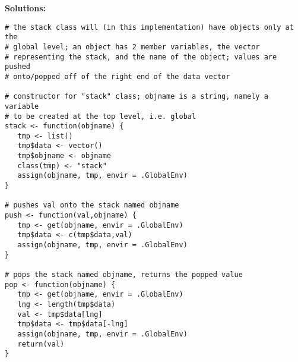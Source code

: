 \documentclass[twocolumn]{article}
\begin{document}
\onecolumn

{\bf Solutions:}

\begin{lstlisting}
# the stack class will (in this implementation) have objects only at the
# global level; an object has 2 member variables, the vector
# representing the stack, and the name of the object; values are pushed
# onto/popped off of the right end of the data vector

# constructor for "stack" class; objname is a string, namely a variable
# to be created at the top level, i.e. global
stack <- function(objname) {
   tmp <- list()
   tmp$data <- vector()
   tmp$objname <- objname
   class(tmp) <- "stack"
   assign(objname, tmp, envir = .GlobalEnv)
}

# pushes val onto the stack named objname
push <- function(val,objname) {
   tmp <- get(objname, envir = .GlobalEnv)
   tmp$data <- c(tmp$data,val)
   assign(objname, tmp, envir = .GlobalEnv)
}

# pops the stack named objname, returns the popped value
pop <- function(objname) {
   tmp <- get(objname, envir = .GlobalEnv)
   lng <- length(tmp$data)
   val <- tmp$data[lng]
   tmp$data <- tmp$data[-lng]
   assign(objname, tmp, envir = .GlobalEnv)
   return(val)
}
\end{lstlisting}
\end{document}

